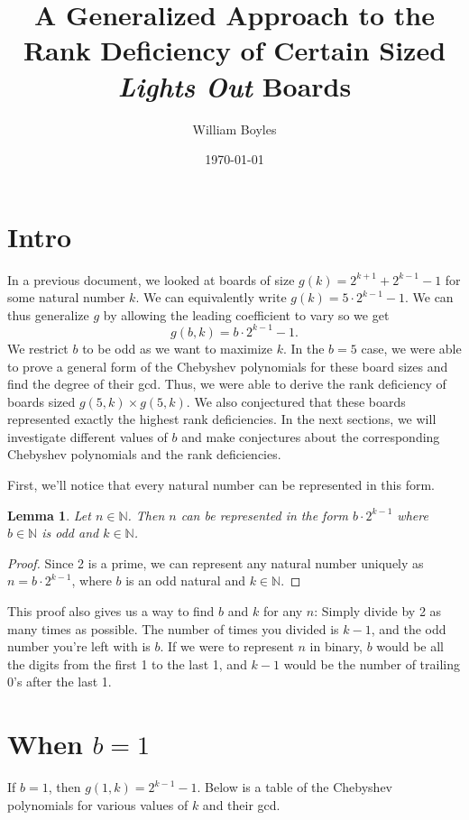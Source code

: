 \documentclass{article}
\newtheorem{lemma}{Lemma}
\newcommand{\N}{\mathbb{N}}
\begin{document}
	\title{A Generalized Approach to the Rank Deficiency of Certain Sized \textit{Lights Out} Boards}
	\author{William Boyles}
	\date{\today}
	\maketitle
	
	\section{Intro}
	In a previous document, we looked at boards of size $g(k) = 2^{k+1} + 2^{k-1} - 1$ for some natural number $k$.
	We can equivalently write $g(k) = 5\cdot2^{k-1} - 1$.
	We can thus generalize $g$ by allowing the leading coefficient to vary so we get
	\begin{equation*}
		g(b,k) = b\cdot2^{k-1} - 1.
	\end{equation*}
	We restrict $b$ to be odd as we want to maximize $k$.
	In the $b=5$ case, we were able to prove a general form of the Chebyshev polynomials for these board sizes and find the degree of their gcd.
	Thus, we were able to derive the rank deficiency of boards sized $g(5,k) \times g(5,k)$.
	We also conjectured that these boards represented exactly the highest rank deficiencies.
	In the next sections, we will investigate different values of $b$ and make conjectures about the corresponding Chebyshev polynomials and the rank deficiencies.
	
	First, we'll notice that every natural number can be represented in this form.
	\begin{lemma}
		Let $n \in \N$.
		Then $n$ can be represented in the form $b\cdot2^{k-1}$ where $b \in \N$ is odd and $k \in \N$.
	\end{lemma}
	\begin{proof}
		Since 2 is a prime, we can represent any natural number uniquely as $n = b\cdot2^{k-1}$, where $b$ is an odd natural and $k \in \N$.
	\end{proof}
	This proof also gives us a way to find $b$ and $k$ for any $n$: Simply divide by 2 as many times as possible. The number of times you divided is $k-1$, and the odd number you're left with is $b$.
	If we were to represent $n$ in binary, $b$ would be all the digits from the first 1 to the last 1, and $k-1$ would be the number of trailing 0's after the last 1.
	
	\newpage
	\section{When $b = 1$}
	If $b=1$, then $g(1,k) = 2^{k-1} - 1$.
	Below is a table of the Chebyshev polynomials for various values of $k$ and their gcd.
	
\end{document}
